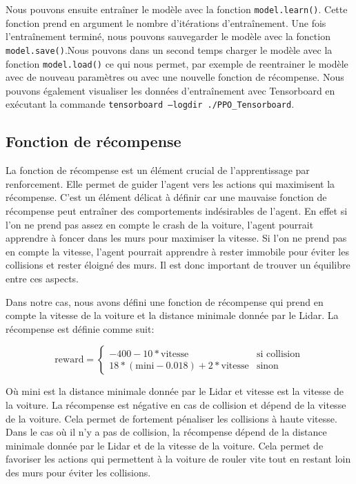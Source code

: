 \documentclass[french]{article}
\begin{document}
Nous pouvons ensuite entraîner le modèle avec la fonction \texttt{model.learn()}. Cette fonction prend en argument
le nombre d'itérations d'entraînement. Une fois l'entraînement terminé, nous pouvons sauvegarder le modèle avec
la fonction \texttt{model.save()}.Nous pouvons dans un second temps charger le modèle avec la fonction 
\texttt{model.load()} ce qui nous permet, par exemple de reentrainer le modèle avec de nouveau paramètres ou avec 
une nouvelle fonction de récompense. Nous pouvons également visualiser les données d'entraînement avec Tensorboard
en exécutant la commande \texttt{tensorboard --logdir ./PPO\_Tensorboard}.


\subsection{Fonction de récompense}
La fonction de récompense est un élément crucial de l'apprentissage par renforcement. Elle permet de guider
l'agent vers les actions qui maximisent la récompense. C'est un élément délicat à définir car une mauvaise
fonction de récompense peut entraîner des comportements indésirables de l'agent. En effet si l'on ne prend pas 
assez en compte le crash de la voiture, l'agent pourrait apprendre à foncer dans les murs pour maximiser la vitesse.
Si l'on ne prend pas en compte la vitesse, l'agent pourrait apprendre à rester immobile pour éviter les collisions et
rester éloigné des murs. Il est donc important de trouver un équilibre entre ces aspects. 

\vspace{0.5cm}
Dans notre cas, nous avons défini une fonction de récompense qui prend en compte la vitesse de la voiture et la distance
minimale donnée par le Lidar. La récompense est définie comme suit:

\begin{equation}
    \text{reward} = \begin{cases}
        -400 - 10 * \text{vitesse} & \text{si collision} \\
        18 * (\text{mini} - 0.018) + 2 * \text{vitesse} & \text{sinon}
    \end{cases}
\end{equation}

Où $\text{mini}$ est la distance minimale donnée par le Lidar et $\text{vitesse}$ est la vitesse de la voiture.
La récompense est négative en cas de collision et dépend de la vitesse de la voiture. Cela permet de fortement pénaliser
les collisions à haute vitesse. Dans le cas où il n'y a pas de collision, la récompense dépend de la distance minimale
donnée par le Lidar et de la vitesse de la voiture. Cela permet de favoriser les actions qui permettent à la voiture
de rouler vite tout en restant loin des murs pour éviter les collisions.
\end{document}
